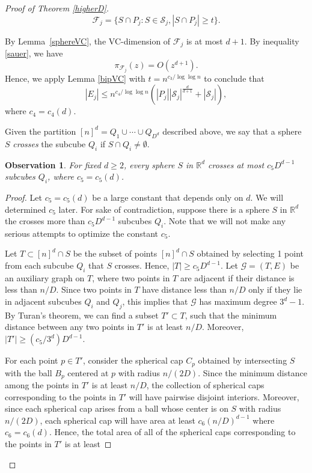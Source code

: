 \documentclass[11pt]{article}
\theoremstyle{plain}
\newtheorem{observation}[theorem]{Observation}
\theoremstyle{definition}
\theoremstyle{remark}
\begin{document}
\begin{proof}[Proof of Theorem \ref{higherD}]
$$\mathcal{F}_{j} = \{S\cap P_{j}: S\in \mathcal{S}_{j}, |S\cap P_j| \geq t\}.$$

\noindent By Lemma~\ref{sphereVC}, the VC-dimension of $\mathcal{F}_j$ is at most $d+1$.  By inequality \eqref{sauer}, we have $$\pi_{\mathcal{F}_j}(z) = O(z^{d+1}).$$ Hence, we apply Lemma \ref{bipVC} with $t = n^{c_3/\log\log n}$ to conclude that  $$|E_j| \leq n^{c_4/\log\log n}\left(|P_j||\mathcal{S}_j|^{\frac{d}{d+1}} + |\mathcal{S}_j|\right),$$ where $c_4 = c_4(d)$.  

Given the partition $[n]^d = Q_1\cup \cdots \cup Q_{D^d}$ described above, we say that a sphere $S$ \emph{crosses} the subcube $Q_i$ if $S\cap Q_i\neq \emptyset$.  

\begin{observation}
For fixed $d \geq 2$, every sphere $S$ in $\mathbb{R}^d$ crosses at most $c_5D^{d-1}$ subcubes $Q_i$, where $c_5 = c_5(d)$.
\end{observation}


\begin{proof}
   Let $c_5 = c_5(d)$ be a large constant that depends only on $d$.  We will determined $c_5$ later.  For sake of contradiction, suppose there is a sphere $S$ in $\mathbb{R}^d$ the crosses more than $c_5D^{d-1}$ subcubes $Q_i$. Note that we will not make any serious attempts to optimize the constant $c_5$.
   
 Let $T \subset [n]^d\cap S$ be the subset of points $[n]^d\cap S$ obtained by selecting 1 point from each subcube $Q_i$ that $S$ crosses.  Hence, $|T| \geq c_5D^{d-1}.$ Let $\mathcal{G} = (T,E)$ be an auxiliary graph on $T$, where two points in $T$ are adjacent if their distance is less than $n/D$.  Since two points in $T$ have distance less than $n/D$ only if they lie in adjacent subcubes $Q_i$ and $Q_j$, this implies that $\mathcal{G}$ has maximum degree $3^d - 1$.  By Turan's theorem, we can find a subset $T'\subset T$, such that the minimum distance between any two points in $T'$ is at least $n/D$.  Moreover, $|T'| \geq (c_5/3^d)D^{d-1}$.  

For each point $p \in T'$, consider the spherical cap $C_p$ obtained by intersecting $S$ with the ball $B_p$ centered at $p$ with radius $n/(2D)$.  Since the minimum distance among the points in $T'$ is at least $n/D$, the collection of spherical caps corresponding to the points in $T'$ will have pairwise disjoint interiors.  Moreover, since each spherical cap arises from a ball whose center is on $S$ with radius $n/(2D)$, each spherical cap will have area at least $c_6(n/D)^{d-1}$ where $c_6 = c_6(d)$.   Hence, the total area of all of the spherical caps corresponding to the points in $T'$ is at least



\end{proof}
\end{proof}
\end{document}
